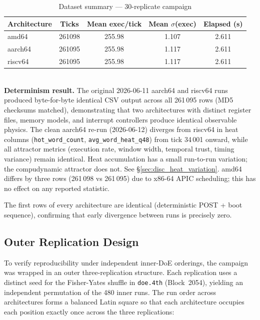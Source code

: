 \documentclass[10pt,a4paper]{article}
\begin{document}
\begin{table}[h!]
\centering
\caption{Dataset summary --- 30-replicate campaign}
\label{tab:dataset}
\begin{tabular}{lSSSS}
\toprule
Architecture & {Ticks} & {Mean exec/tick} & {Mean $\sigma$(exec)} & {Elapsed (s)} \\
\midrule
amd64   & 261098 & 255.98 & 1.107 & 2.611 \\
aarch64 & 261095 & 255.98 & 1.117 & 2.611 \\
riscv64 & 261095 & 255.98 & 1.117 & 2.611 \\
\bottomrule
\end{tabular}
\smallskip\\
{\footnotesize \textbf{Determinism result.}
  The original 2026-06-11 aarch64 and riscv64 runs produced byte-for-byte
  identical CSV output across all 261\,095 rows (MD5 checksums matched),
  demonstrating that two architectures with distinct register files, memory
  models, and interrupt controllers produce identical observable physics.
  The clean aarch64 re-run (2026-06-12) diverges from riscv64 in heat
  columns (\texttt{hot\_word\_count}, \texttt{avg\_word\_heat\_q48}) from
  tick 34\,001 onward, while all attractor metrics (execution rate, window
  width, temporal trust, timing variance) remain identical.  Heat accumulation
  has a small run-to-run variation; the compudynamic attractor does not.
  See \S\ref{sec:disc_heat_variation}.
  amd64 differs by three rows (261\,098 vs 261\,095) due to x86-64 APIC
  scheduling; this has no effect on any reported statistic.}
\end{table}

The first rows of every architecture are identical (deterministic
POST + boot sequence), confirming that early divergence between runs is
precisely zero.

\subsection{Outer Replication Design}
\label{sec:outer_design}

To verify reproducibility under independent inner-DoE orderings, the campaign
was wrapped in an outer three-replication structure.  Each replication uses a
distinct seed for the Fisher-Yates shuffle in \texttt{doe.4th} (Block~2054),
yielding an independent permutation of the 480 inner runs.  The run order
across architectures forms a balanced Latin square so that each architecture
occupies each position exactly once across the three replications:
\end{document}
